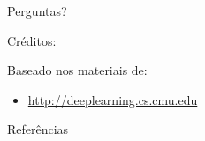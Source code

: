 \documentclass{beamer}
\theoremstyle{definition}
\begin{document}

{
\begin{frame}[standout]
  Perguntas?
\end{frame}
}

\begin{frame}{Créditos:}

  Baseado nos materiais de:
  \begin{itemize}
    \item \href{http://deeplearning.cs.cmu.edu/}{http://deeplearning.cs.cmu.edu}
  \end{itemize}

\end{frame}


\begin{frame}[allowframebreaks]{Referências}

  
  

\end{frame}
\end{document}
